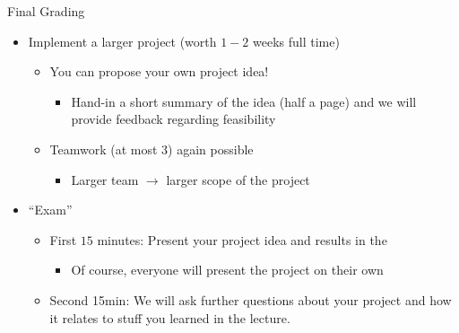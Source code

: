 \documentclass[aspectratio=169]{./latex_main/tntbeamer}  %
\begin{document}
\begin{frame}[c]{Final Grading}
	
	\begin{itemize}
		\item Implement a larger project (worth $1-2$ weeks full time)
		\begin{itemize}
			\item You can propose your own project idea!
			\begin{itemize}
				\item Hand-in a short summary of the idea (half a page) and we will provide feedback regarding feasibility
			\end{itemize}
			\item Teamwork (at most 3) again possible
			\begin{itemize}
				\item Larger team $\to$ larger scope of the project
			\end{itemize}
		\end{itemize}
		\item ``Exam''
		\begin{itemize}
			\item First $15$ minutes: Present your project idea and results in the 
			\begin{itemize}
				\item Of course, everyone will present the project on their own
			\end{itemize}
			\item Second 15min: We will ask further questions about your project and how it relates to stuff you learned in the lecture.
		\end{itemize}	
	\end{itemize}
	
\end{frame}
\end{document}
